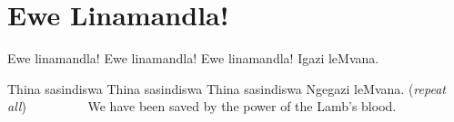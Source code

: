 \starttocol
\chapter{Ewe Linamandla!}
\nexttocol
\hfill{\it }
\stoptocol
\starttocol
\startlines
E{\sc we} linamandla!
Ewe linamandla!
Ewe linamandla!
Igazi leMvana.

Thina sasindiswa
Thina sasindiswa
Thina sasindiswa
Ngegazi leMvana. \hfill({\it repeat all})~~~~~~~~~
\stoplines
\nexttocol
We have been saved by the power of the Lamb's blood.
\stoptocol

